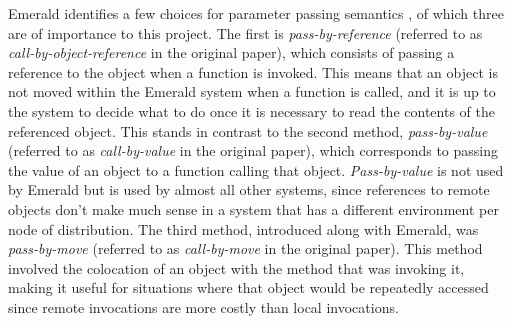 Emerald identifies a few choices for parameter passing semantics \cite{JulEric1988Fmit}, of which three are of importance to this project. The first is \textit{pass-by-reference} (referred to as \textit{call-by-object-reference} in the original paper), which consists of passing a reference to the object when a function is invoked. This means that an object is not moved within the Emerald system when a function is called, and it is up to the system to decide what to do once it is necessary to read the contents of the referenced object. This stands in contrast to the second method, \textit{pass-by-value} (referred to as \textit{call-by-value} in the original paper), which corresponds to passing the value of an object to a function calling that object. \textit{Pass-by-value} is not used by Emerald but is used by almost all other systems, since references to remote objects don't make much sense in a system that has a different environment per node of distribution. The third method, introduced along with Emerald, was \textit{pass-by-move} (referred to as \textit{call-by-move} in the original paper). This method involved the colocation of an object with the method that was invoking it, making it useful for situations where that object would be repeatedly accessed since remote invocations are more costly than local invocations. 

